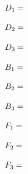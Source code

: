 \documentclass[fleqn]{article}
\begin{document}
\begin{enumerate}
    $
      D_1=
      \\
      \\
    $

    $
      D_2=
      \\
      \\
    $

    $
      D_3=
      \\
      \\
    $

    $
      B_1=
      \\
      \\
    $

    $
      B_2=
      \\
      \\
    $

    $
      B_3=
      \\
      \\
    $

    $
      F_1=
      \\
      \\
    $

    $
      F_2=
      \\
      \\
    $

    $
      F_3=
      \\
      \\
    $
    
  \end{enumerate}
\end{document}

